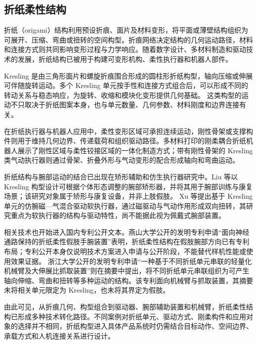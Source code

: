 \subsection{折纸柔性结构}

折纸（origami）结构利用预设折痕、面片及材料变形，将平面或薄壁结构组织为可展开、压缩、弯曲或扭转的空间构型。折痕网络决定结构的几何运动路径，材料和连接方式则共同影响变形过程与力学响应。随着数字设计、多材料制造和驱动技术的发展，折纸结构已被用于构建可变形机构、柔性执行器和机器人部件。\cite{Xue2024RigidFlexibleOrigami}

Kresling 是由三角形面片和螺旋折痕围合形成的圆柱形折纸构型，轴向压缩或伸展可伴随旋转运动。多个 Kresling 单元按手性和连接方式组合后，可以形成不同的转动关系与稳态响应，为旋转、收缩和模块化变形提供几何基础。\cite{Li2020CoupledKresling} 这类构型的运动不只取决于折纸图案本身，也与单元数量、几何参数、材料刚度和边界连接有关。

在折纸执行器与机器人应用中，柔性变形区域可承担连续运动，刚性骨架或支撑构件则用于维持几何边界、传递载荷和组织驱动路径。多材料打印的刚柔耦合折纸机器人展示了刚性区域与柔性铰接区域的一体化制造方式；带有刚性骨架的 Kresling 类气动执行器则通过骨架、折叠外形与气动变形的配合形成轴向和弯曲运动。\cite{Xue2024RigidFlexibleOrigami,Tang2024KreslingRigidSkeleton}

折纸结构与腕部运动的结合已出现在矫形辅助和仿生执行器研究中。Liu 等以 Kresling 构型设计可根据个体形态调整的腕部矫形器，并将其用于腕部训练与康复场景；该研究对象属于矫形与康复设备，并非上肢假肢。\cite{Liu2025KreslingWristOrthosis} Xu 等提出基于 Kresling 单元的仿腕磁—气混合驱动软执行器，通过磁驱动与气动作用形成双向扭转，其研究重点为软执行器的结构与驱动特性，尚不能据此视为佩戴式腕部装置。\cite{Xu2024WristInspiredKresling}

相关技术也开始进入国内专利公开文本。燕山大学公开的发明专利申请“面向神经通路保持的折纸柔性假肢手腕装置”表明，折纸柔性结构在假肢腕部方向已有专利布局；专利公开本身仅说明技术方案进入申请与公开阶段，不能替代样机性能或使用效果证据。\cite{Yanshan2026OrigamiProstheticWristPatent} 浙江大学公开的发明专利申请“一种基于不同折纸单元串联的轻量化机械臂及大伸展比抓取装置”则在摘要中提出，将不同折纸单元串联组织为可产生轴向伸缩、弯曲和扭转等多种运动的结构。该专利面向机械臂与抓取装置，其摘要未将相关单元限定为 Kresling，也未将其界定为假肢。\cite{Zhejiang2026SerialOrigamiArmPatent}

由此可见，从折痕几何、构型组合到驱动器、腕部辅助装置和机械臂，折纸柔性结构已形成多种技术转化路径。不同案例对折纸单元、驱动方式、刚柔构件和应用对象的选择并不相同，折纸构型进入具体产品系统时仍需结合目标动作、空间边界、承载方式和人机连接关系进行设计。

